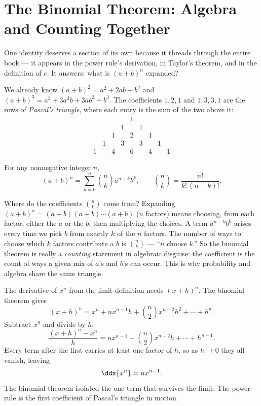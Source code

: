 \section{The Binomial Theorem: Algebra and Counting Together}
\label{ch40:binomial}

One identity deserves a section of its own because it threads through the entire
book --- it appears in the power rule's derivation, in Taylor's theorem, and in
the definition of $e$. It answers: what is $(a+b)^n$ expanded?

We already know $(a+b)^2 = a^2 + 2ab + b^2$ and $(a+b)^3 = a^3 + 3a^2b + 3ab^2 +
b^3$. The coefficients $1,2,1$ and $1,3,3,1$ are the rows of \emph{Pascal's
triangle}, where each entry is the sum of the two above it:
\[
  \begin{array}{ccccccccc}
   & & & & 1 & & & & \\
   & & & 1 & & 1 & & & \\
   & & 1 & & 2 & & 1 & & \\
   & 1 & & 3 & & 3 & & 1 & \\
   1 & & 4 & & 6 & & 4 & & 1
  \end{array}
\]

\begin{theorem}
\label{ch40:thm-binomial}
For any nonnegative integer $n$,
\[
  (a+b)^n = \sum_{k=0}^{n} \binom{n}{k} a^{n-k} b^{k},
  \qquad \binom{n}{k} = \frac{n!}{k!\,(n-k)!}.
\]
\end{theorem}

\begin{happeningbox}
Where do the coefficients $\binom{n}{k}$ come from? Expanding $(a+b)^n =
(a+b)(a+b)\cdots(a+b)$ ($n$ factors) means choosing, from each factor, either the
$a$ or the $b$, then multiplying the choices. A term $a^{n-k}b^k$ arises every time
we pick $b$ from exactly $k$ of the $n$ factors. The number of ways to choose which
$k$ factors contribute a $b$ is $\binom{n}{k}$ --- ``$n$ choose $k$.'' So the
binomial theorem is really a \emph{counting} statement in algebraic disguise: the
coefficient is the count of ways a given mix of $a$'s and $b$'s can occur. This is
why probability and algebra share the same triangle.
\end{happeningbox}

\begin{example}
\label{ch40:ex-binom-power}
The derivative of $x^n$ from the limit definition needs $(x+h)^n$. The binomial
theorem gives
\[
  (x+h)^n = x^n + n x^{n-1} h + \binom{n}{2} x^{n-2} h^2 + \cdots + h^n.
\]
Subtract $x^n$ and divide by $h$:
\[
  \frac{(x+h)^n - x^n}{h} = n x^{n-1} + \binom{n}{2}x^{n-2} h + \cdots + h^{n-1}.
\]
Every term after the first carries at least one factor of $h$, so as $h \to 0$ they
all vanish, leaving
\[
  \ddx{x^n} = n x^{n-1}.
\]
The binomial theorem isolated the one term that survives the limit. The power rule
is the first coefficient of Pascal's triangle in motion.
\end{example}

